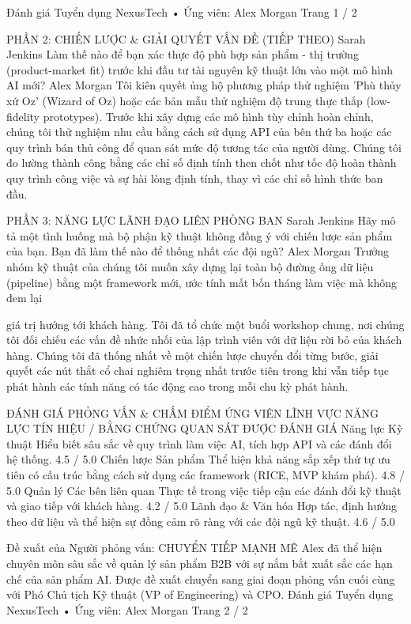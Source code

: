Đánh giá Tuyển dụng NexusTech • Ứng viên: Alex Morgan
Trang 1 / 2

PHẦN 2: CHIẾN LƯỢC \& GIẢI QUYẾT VẤN ĐỀ (TIẾP THEO)
Sarah Jenkins
Làm thế nào để bạn xác thực độ phù hợp sản phẩm - thị trường (product-market fit) trước khi đầu tư tài nguyên kỹ thuật lớn vào một mô hình AI mới?
Alex Morgan
Tôi kiên quyết ủng hộ phương pháp thử nghiệm 'Phù thủy xứ Oz' (Wizard of Oz) hoặc các bản mẫu thử nghiệm độ trung thực thấp (low-fidelity prototypes). Trước khi xây dựng các mô hình tùy chỉnh hoàn chỉnh, chúng tôi thử nghiệm nhu cầu bằng cách sử dụng API của bên thứ ba hoặc các quy trình bán thủ công để quan sát mức độ tương tác của người dùng. Chúng tôi đo lường thành công bằng các chỉ số định tính then chốt như tốc độ hoàn thành quy trình công việc và sự hài lòng định tính, thay vì các chỉ số hình thức ban đầu.

PHẦN 3: NĂNG LỰC LÃNH ĐẠO LIÊN PHÒNG BAN
Sarah Jenkins
Hãy mô tả một tình huống mà bộ phận kỹ thuật không đồng ý với chiến lược sản phẩm của bạn. Bạn đã làm thế nào để thống nhất các đội ngũ?
Alex Morgan
Trưởng nhóm kỹ thuật của chúng tôi muốn xây dựng lại toàn bộ đường ống dữ liệu (pipeline) bằng một framework mới, ước tính mất bốn tháng làm việc mà không đem lại

giá trị hướng tới khách hàng. Tôi đã tổ chức một buổi workshop chung, nơi chúng tôi đối chiếu các vấn đề nhức nhối của lập trình viên với dữ liệu rời bỏ của khách hàng. Chúng tôi đã thống nhất về một chiến lược chuyển đổi từng bước, giải quyết các nút thắt cổ chai nghiêm trọng nhất trước tiên trong khi vẫn tiếp tục phát hành các tính năng có tác động cao trong mỗi chu kỳ phát hành.

ĐÁNH GIÁ PHỎNG VẤN \& CHẤM ĐIỂM ỨNG VIÊN
LĨNH VỰC NĂNG LỰC
TÍN HIỆU / BẰNG CHỨNG QUAN SÁT ĐƯỢC
ĐÁNH GIÁ
Năng lực Kỹ thuật
Hiểu biết sâu sắc về quy trình làm việc AI, tích hợp API và các đánh đổi hệ thống.
4.5 /
5.0
Chiến lược Sản phẩm
Thể hiện khả năng sắp xếp thứ tự ưu tiên có cấu trúc bằng cách sử dụng các framework (RICE, MVP khám phá).
4.8 /
5.0
Quản lý Các bên liên quan
Thực tế trong việc tiếp cận các đánh đổi kỹ thuật và giao tiếp với khách hàng.
4.2 /
5.0
Lãnh đạo \& Văn hóa
Hợp tác, định hướng theo dữ liệu và thể hiện sự đồng cảm rõ ràng với các đội ngũ kỹ thuật.
4.6 /
5.0

Đề xuất của Người phỏng vấn: CHUYỂN TIẾP MẠNH MẼ
Alex đã thể hiện chuyên môn sâu sắc về quản lý sản phẩm B2B với sự nắm bắt xuất sắc các hạn chế của sản phẩm AI. Được đề xuất chuyển sang giai đoạn phỏng vấn cuối cùng với Phó Chủ tịch Kỹ thuật (VP of Engineering) và CPO.
Đánh giá Tuyển dụng NexusTech • Ứng viên: Alex Morgan
Trang 2 / 2
